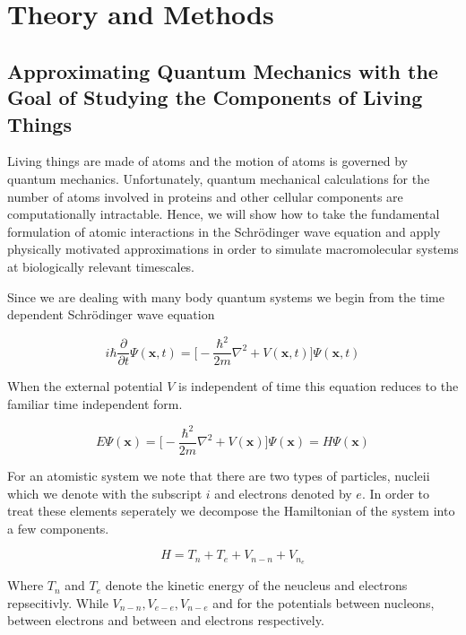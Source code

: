 \chapter{Theory and Methods}
\label{chap:methods}

\section{Approximating Quantum Mechanics with the Goal of Studying the Components of Living Things}
Living things are made of atoms and the motion of atoms is governed by quantum mechanics. Unfortunately, quantum mechanical calculations for the number of atoms involved in proteins and other cellular components are computationally intractable. Hence, we will show how to take the fundamental formulation of atomic interactions in the Schr\"{o}dinger wave equation and apply physically motivated approximations in order to simulate macromolecular systems at biologically relevant timescales. 

Since we are dealing with many body quantum systems we begin from the time dependent Schr\"{o}dinger wave equation 

\begin{equation}
i\hbar \frac {\partial}{\partial t} \Psi (\textbf{x},t) = \big[ -\frac{\hbar ^2}{2m}\nabla^2 + V (\textbf{x}, t) \big] \Psi (\textbf{x},t) 
\end{equation}

When the external potential $V$ is independent of time this equation reduces to the familiar time independent form. 

\begin{equation}
	E \Psi (\textbf{x}) = \big[ -\frac{\hbar ^2}{2m}\nabla^2 + V (\textbf{x}) \big] \Psi (\textbf{x}) = H \Psi(\textbf{x}) 
 \end{equation}

For an atomistic system we note that there are two types of particles, nucleii which we denote with the subscript $i$ and electrons denoted by $e$. In order to treat these elements seperately we decompose the Hamiltonian of the system into a few components. 

\begin {equation}
H = T_n + T_e + V_{n-n} + V_{n_e}
\end{equation}

Where $T_n$ and $T_e$ denote the kinetic energy of the neucleus and electrons repsecitivly. While $V_{n-n}, V_{e-e}, V_{n-e}$ and for the potentials between nucleons, between  electrons and between and electrons respectively.

